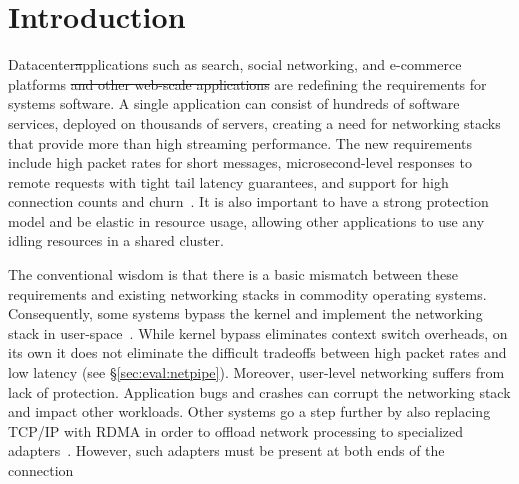 
\section{Introduction}
\label{sec:intro}


Datacenter\sout applications such as search, social networking, and
e-commerce platforms \sout{and other web-scale applications}  are redefining the requirements for systems
software. A single application can consist of hundreds of software
services, deployed on thousands of servers, creating a need for
networking stacks that provide more than high streaming performance.
The new requirements include high packet rates for short messages,
microsecond-level responses to remote requests with tight tail latency
guarantees, and support for high connection counts and
churn~\cite{Atikoglu:2012:WAL,DBLP:journals/cacm/DeanB13,DBLP:conf/nsdi/NishtalaFGKLLMPPSSTV13}.
It is also important to have a strong protection model and be elastic
in resource usage, allowing other applications to use any idling
resources in a shared
cluster. %

The conventional wisdom is that there is a basic mismatch between
these requirements and existing networking stacks in commodity
operating systems. Consequently, some systems bypass the kernel and
implement the networking stack in
user-space~\cite{jeong2014mtcp,DBLP:conf/cloud/KapoorPTVV12,sandstorm,openonload,DBLP:conf/sigcomm/ThekkathNML93}.
While kernel bypass eliminates context switch overheads, on its own it
does not eliminate the difficult tradeoffs between high packet rates
and low latency (see \S\ref{sec:eval:netpipe}). Moreover, user-level
networking suffers from lack of protection. Application bugs and
crashes can corrupt the networking stack and impact other workloads.
Other systems go a step further by also replacing TCP/IP with RDMA in
order to offload network processing to specialized
adapters~\cite{dragojevic14farm,DBLP:conf/icpp/JoseSLZHWIOWSP11,mitchell:rdma,DBLP:conf/sosp/OngaroRSOR11}.
However, such adapters must be present at both ends of the connection


